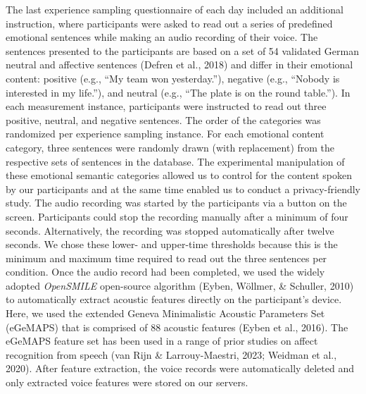 \documentclass[
  english,
  man,floatsintext]{apa6}
\begin{document}
The last experience sampling questionnaire of each day included an additional instruction, where participants were asked to read out a series of predefined emotional sentences while making an audio recording of their voice. The sentences presented to the participants are based on a set of 54 validated German neutral and affective sentences (Defren et al., 2018) and differ in their emotional content: positive (e.g., ``My team won yesterday.''), negative (e.g., ``Nobody is interested in my life.''), and neutral (e.g., ``The plate is on the round table.''). In each measurement instance, participants were instructed to read out three positive, neutral, and negative sentences. The order of the categories was randomized per experience sampling instance. For each emotional content category, three sentences were randomly drawn (with replacement) from the respective sets of sentences in the database. The experimental manipulation of these emotional semantic categories allowed us to control for the content spoken by our participants and at the same time enabled us to conduct a privacy-friendly study. The audio recording was started by the participants via a button on the screen. Participants could stop the recording manually after a minimum of four seconds. Alternatively, the recording was stopped automatically after twelve seconds. We chose these lower- and upper-time thresholds because this is the minimum and maximum time required to read out the three sentences per condition. Once the audio record had been completed, we used the widely adopted \emph{OpenSMILE} open-source algorithm (Eyben, Wöllmer, \& Schuller, 2010) to automatically extract acoustic features directly on the participant's device. Here, we used the extended Geneva Minimalistic Acoustic Parameters Set (eGeMAPS) that is comprised of 88 acoustic features (Eyben et al., 2016). The eGeMAPS feature set has been used in a range of prior studies on affect recognition from speech (van Rijn \& Larrouy-Maestri, 2023; Weidman et al., 2020). After feature extraction, the voice records were automatically deleted and only extracted voice features were stored on our servers.
\end{document}
